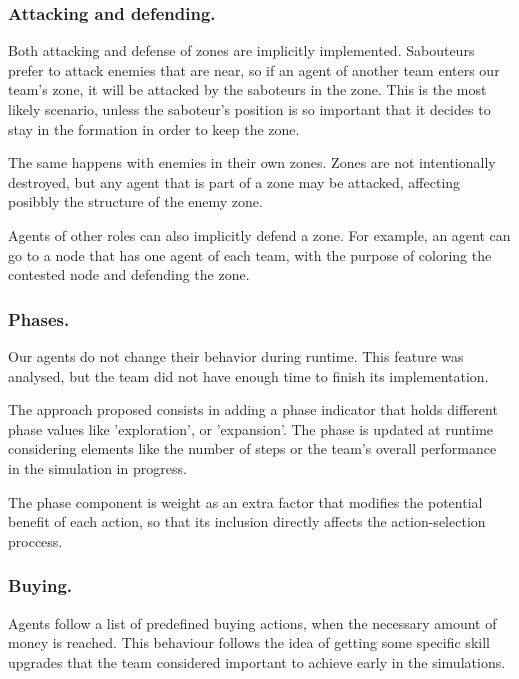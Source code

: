 \documentclass{llncs2e/llncs}
\begin{document}
\subsubsection{Attacking and defending.}
    
    Both attacking and defense of zones are implicitly implemented. 
    Sabouteurs prefer to attack enemies that are near, so if an agent of another 
    team enters our team's zone, it will be attacked by the saboteurs in the zone.
    This is the most likely scenario, unless the saboteur's position is so 
    important that it decides to stay in the formation in order to keep the zone.

    The same happens with enemies in their own zones. Zones are not intentionally 
    destroyed, but any agent that is part of a zone may be attacked, affecting 
    posibbly the structure of the enemy zone.
    
    Agents of other roles can also implicitly defend a zone. For example, an agent 
    can go to a node that has one agent of each team, with the purpose of coloring the 
    contested node and defending the zone.
    
\subsubsection{Phases.}

    Our agents do not change their behavior during runtime. This feature was 
    analysed, but the team did not have enough time to finish its implementation.
    
    The approach proposed consists in adding a phase indicator that holds different 
    phase values like 'exploration', or 'expansion'. The phase is updated at runtime
    considering elements like the number of steps or the team's overall performance 
    in the simulation in progress.
    
    The phase component is weight as an extra factor that modifies the potential 
    benefit of each action, so that its inclusion directly affects the action-selection 
    proccess.
    
\subsubsection{Buying.}

    Agents follow a list of predefined buying actions, when the necessary amount 
    of money is reached. This behaviour follows the idea of getting some specific skill 
    upgrades that the team considered important to achieve early in the simulations.
    
\end{document}
